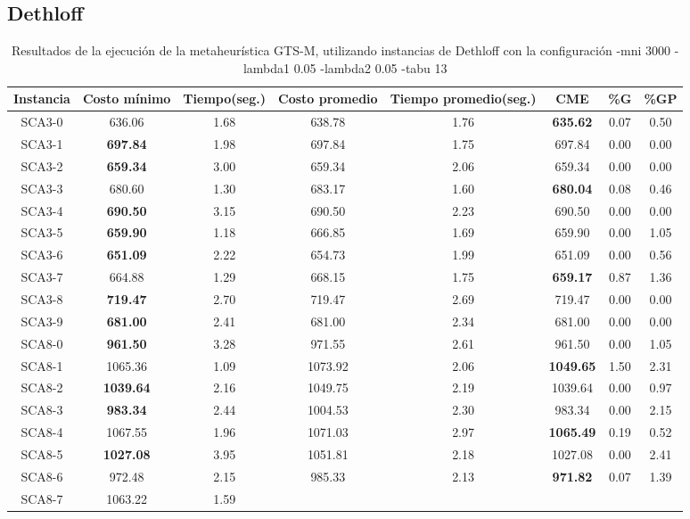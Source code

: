 \subsection{Dethloff}\label{tablas-entonacion-GTS-M-dethloff}

\begin{table}[h]
\caption{Resultados de la ejecución de la metaheurística GTS-M, utilizando instancias de Dethloff con la configuración -mni 3000 -lambda1 0.05 -lambda2 0.05 -tabu 13}
\centering
\small
\begin{tabular}{c c c c c c c c}
\hline\hline
Instancia & Costo mínimo & Tiempo(seg.) & Costo promedio & Tiempo promedio(seg.) & CME & \%G & \%GP \\ [0.5ex]
\hline
SCA3-0 & 636.06 & 1.68 & 
638.78 & 1.76 & \bf{635.62} & 
0.07 & 0.50\\SCA3-1 & \bf{697.84} & 1.98 & 
697.84 & 1.75 & 697.84 & 0.00
 & 0.00\\
SCA3-2 & \bf{659.34} & 3.00 & 
659.34 & 2.06 & 659.34 & 0.00
 & 0.00\\
SCA3-3 & 680.60 & 1.30 & 
683.17 & 1.60 & \bf{680.04} & 
0.08 & 0.46\\SCA3-4 & \bf{690.50} & 3.15 & 
690.50 & 2.23 & 690.50 & 0.00
 & 0.00\\
SCA3-5 & \bf{659.90} & 1.18 & 
666.85 & 1.69 & 659.90 & 0.00
 & 1.05\\SCA3-6 & \bf{651.09} & 2.22 & 
654.73 & 1.99 & 651.09 & 0.00
 & 0.56\\SCA3-7 & 664.88 & 1.29 & 
668.15 & 1.75 & \bf{659.17} & 
0.87 & 1.36\\SCA3-8 & \bf{719.47} & 2.70 & 
719.47 & 2.69 & 719.47 & 0.00
 & 0.00\\
SCA3-9 & \bf{681.00} & 2.41 & 
681.00 & 2.34 & 681.00 & 0.00
 & 0.00\\
SCA8-0 & \bf{961.50} & 3.28 & 
971.55 & 2.61 & 961.50 & 0.00
 & 1.05\\SCA8-1 & 1065.36 & 1.09 & 
1073.92 & 2.06 & \bf{1049.65} & 
1.50 & 2.31\\SCA8-2 & \bf{1039.64} & 2.16 & 
1049.75 & 2.19 & 1039.64 & 0.00
 & 0.97\\SCA8-3 & \bf{983.34} & 2.44 & 
1004.53 & 2.30 & 983.34 & 0.00
 & 2.15\\SCA8-4 & 1067.55 & 1.96 & 
1071.03 & 2.97 & \bf{1065.49} & 
0.19 & 0.52\\SCA8-5 & \bf{1027.08} & 3.95 & 
1051.81 & 2.18 & 1027.08 & 0.00
 & 2.41\\SCA8-6 & 972.48 & 2.15 & 
985.33 & 2.13 & \bf{971.82} & 
0.07 & 1.39\\SCA8-7 & 1063.22 & 1.59 & 

\end{tabular}
\end{table}
